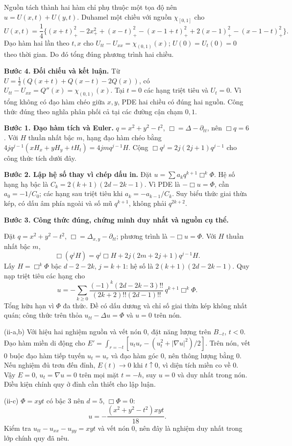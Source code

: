 Nguồn tách thành hai hàm chỉ phụ thuộc một tọa độ nên $u=U(x,t)+U(y,t)$. Duhamel một chiều với nguồn $\chi_{[0,1]}$ cho
\[U(x,t)=\frac14\{(x+t)_+^2-2x_+^2+(x-t)_+^2-(x-1+t)_+^2+2(x-1)_+^2-(x-1-t)_+^2\}.\]
Đạo hàm hai lần theo $t,x$ cho $U_{tt}-U_{xx}=\chi_{(0,1)}(x)$; $U(0)=U_t(0)=0$ theo thời gian. Do đó tổng đúng phương trình hai chiều.

\textbf{Bước 4. Đối chiếu và kết luận.} Từ $U=\frac12(Q(x+t)+Q(x-t)-2Q(x))$, có $U_{tt}-U_{xx}=Q''(x)=\chi_{(0,1)}(x)$. Tại $t=0$ các hạng triệt tiêu và $U_t=0$. Vì tổng không có đạo hàm chéo giữa $x,y$, PDE hai chiều có đúng hai nguồn. Công thức đúng theo nghĩa phân phối cả tại các đường cận chạm $0,1$.

\textbf{Bước 1. Đạo hàm tích và Euler.} $q=x^2+y^2-t^2$, $\Box=\Delta-\partial_{tt}$, nên $\Box q=6$. Với $H$ thuần nhất bậc $m$, hạng đạo hàm chéo bằng $4j q^{j-1}(xH_x+yH_y+tH_t)=4jm q^{j-1}H$. Cộng $\Box q^j=2j(2j+1)q^{j-1}$ cho công thức tích dưới đây.

\textbf{Bước 2. Lập hệ số thay vì chép dấu in.} Đặt $u=\sum a_kq^{k+1}\Box^k\Phi$. Hệ số hạng hạ bậc là $C_k=2(k+1)(2d-2k-1)$. Vì PDE là $-\Box u=\Phi$, cần $a_0=-1/C_0$; các hạng sau triệt tiêu khi $a_k=-a_{k-1}/C_k$. Suy biểu thức giai thừa kép, có dấu âm phía ngoài và số mũ $q^{k+1}$, không phải $q^{2k+2}$.

\textbf{Bước 3. Công thức đúng, chứng minh duy nhất và nguồn cụ thể.}

Đặt $q=x^2+y^2-t^2$, $\Box=\Delta_{x,y}-\partial_{tt}$; phương trình là $-\Box u=\Phi$. Với $H$ thuần nhất bậc $m$,
\[\Box(q^jH)=q^j\Box H+2j(2m+2j+1)q^{j-1}H.\]
Lấy $H=\Box^k\Phi$ bậc $d-2-2k$, $j=k+1$: hệ số là $2(k+1)(2d-2k-1)$. Quy nạp triệt tiêu các hạng cho
\[u=-\sum_{k\ge0}\frac{(-1)^k(2d-2k-3)!!}{(2k+2)!!(2d-1)!!}\,q^{k+1}\Box^k\Phi.\]
Tổng hữu hạn vì $\Phi$ đa thức. Đề có dấu dương và chỉ số giai thừa kép không nhất quán; công thức trên thỏa $u_{tt}-\Delta u=\Phi$ và $u=0$ trên nón.

(ii-a,b) Với hiệu hai nghiệm nguồn và vết nón 0, đặt năng lượng trên $B_{-t}$, $t<0$. Đạo hàm miền di động cho $E'=\int_{r=-t}[u_tu_r-(u_t^2+|\nabla u|^2)/2]$. Trên nón, vết 0 buộc đạo hàm tiếp tuyến $u_t=u_r$ và đạo hàm góc 0, nên thông lượng bằng 0. Nếu nghiệm đủ trơn đến đỉnh, $E(t)\to0$ khi $t\uparrow0$, vì diện tích miền co về 0. Vậy $E=0$, $u_t=\nabla u=0$ trên mọi mặt $t=-h$, suy $u=0$ và duy nhất trong nón. Điều kiện chính quy ở đỉnh cần thiết cho lập luận.

(ii-c) $\Phi=xyt$ có bậc 3 nên $d=5$, $\Box\Phi=0$:
\[u=-\frac{(x^2+y^2-t^2)xyt}{18}.\]
Kiểm tra $u_{tt}-u_{xx}-u_{yy}=xyt$ và vết nón 0, nên đây là nghiệm duy nhất trong lớp chính quy đã nêu.

